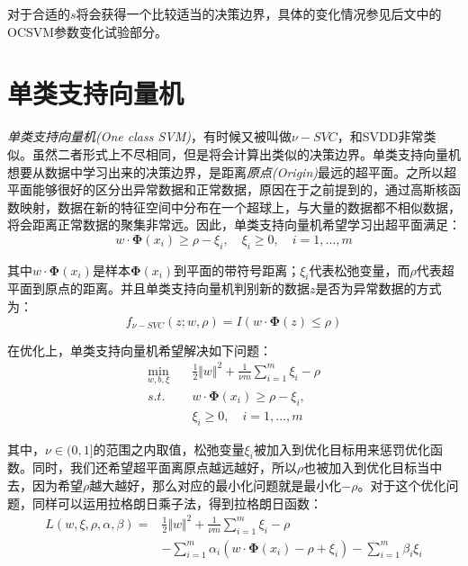 \documentclass[UTF8, 12pt]{ctexart}
\begin{document}
对于合适的$s$将会获得一个比较适当的决策边界，具体的变化情况参见后文中的OCSVM参数变化试验部分。

\section{单类支持向量机}
\emph{单类支持向量机(One class SVM)}，有时候又被叫做$\nu-SVC$，和SVDD非常类似。虽然二者形式上不尽相同，但是将会计算出类似的决策边界。单类支持向量机想要从数据中学习出来的决策边界，是距离\emph{原点(Origin)}最远的超平面。之所以超平面能够很好的区分出异常数据和正常数据，原因在于之前提到的，通过高斯核函数映射，数据在新的特征空间中分布在一个超球上，与大量的数据都不相似数据，将会距离正常数据的聚集非常远。因此，单类支持向量机希望学习出超平面满足：
\begin{equation}
	w · \boldsymbol{\Phi}(x_{i}) \geq \rho - \xi_{i}, \quad \xi_{i} \geq 0, \quad i = 1,...,m
\end{equation}

其中$w · \boldsymbol{\Phi}(x_{i})$是样本$\boldsymbol{\Phi}(x_{i})$到平面的带符号距离；$\xi_{i}$代表松弛变量，而$\rho$代表超平面到原点的距离。并且单类支持向量机判别新的数据$z$是否为异常数据的方式为：
\begin{equation}
	f_{\nu-SVC}(z;w,\rho) = I(w · \boldsymbol{\Phi}(z) \leq \rho)
\end{equation}

在优化上，单类支持向量机希望解决如下问题：
\begin{align}
	\label{Constrain}
	\min_{w,b,\xi} &  \quad \frac{1}{2}{\Vert w \Vert}^{2} + \frac{1}{\nu m}\sum_{i=1}^{m}\xi_{i} - \rho\\
	s.t. &  \quad w·\boldsymbol{\Phi}(x_{i}) \geq \rho - \xi_{i},\\
	  {} & \quad \xi_{i} \geq 0, \quad i=1,...,m
\end{align}

其中，$\nu \in (0, 1]$的范围之内取值，松弛变量$\xi_{i}$被加入到优化目标用来惩罚优化函数。同时，我们还希望超平面离原点越远越好，所以$\rho$也被加入到优化目标当中去，因为希望$\rho$越大越好，那么对应的最小化问题就是最小化$-\rho$。对于这个优化问题，同样可以运用拉格朗日乘子法，得到拉格朗日函数：
\begin{align}
	 L(w, \xi, \rho, \alpha, \beta) = {} & \frac{1}{2}{\Vert w \Vert}^2 + \frac{1}{\nu m} \sum_{i=1}^{m}\xi_{i} - \rho \\
	 {} & -\sum_{i=1}^{m} \alpha_{i}(w·\boldsymbol{\Phi}(x_{i}) - \rho + \xi_{i}) - \sum_{i=1}^{m}\beta_{i}\xi_{i}
\end{align}
\end{document}

